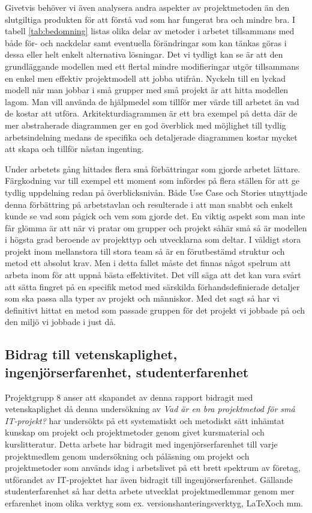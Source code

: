 \documentclass[conference]{IEEEtran}
\begin{document}
Givetvis behöver vi även analysera andra aspekter av projektmetoden än den slutgiltiga produkten för att förstå vad som har fungerat bra och mindre bra. I tabell \ref{tab:bedomning} listas olika delar av metoder i arbetet tillsammans med både för- och nackdelar samt eventuella förändringar som kan tänkas göras i dessa eller helt enkelt alternativa lösningar. Det vi tydligt kan se är att den grundläggande modellen med ett flertal mindre modifieringar utgör tillsammans en enkel men effektiv projektmodell att jobba utifrån. Nyckeln till en lyckad modell när man jobbar i små grupper med små projekt är att hitta modellen lagom. Man vill använda de hjälpmedel som tillför mer värde till arbetet än vad de kostar att utföra. Arkitekturdiagrammen är ett bra exempel på detta där de mer abstraherade diagrammen ger en god överblick med möjlighet till tydlig arbetsindelning medans de specifika och detaljerade diagrammen kostar mycket att skapa och tillför nästan ingenting.

Under arbetets gång hittades flera små förbättringar som gjorde arbetet lättare. Färgkodning var till exempel ett moment som infördes på flera ställen för att ge tydlig uppdelning redan på överblicksnivån. Både Use Case och Stories utnyttjade denna förbättring på arbetstavlan och resulterade i att man snabbt och enkelt kunde se vad som pågick och vem som gjorde det. En viktig aspekt som man inte får glömma är att när vi pratar om grupper och projekt såhär små så är modellen i högsta grad beroende av projekttyp och utvecklarna som deltar. I väldigt stora projekt inom mellanstora till stora team så är en förutbestämd struktur och metod ett absolut krav. Men i detta fallet måste det finnas något spelrum att arbeta inom för att uppnå bästa effektivitet. Det vill säga att det kan vara svårt att sätta fingret på en specifik metod med särskilda förhandsdefinierade detaljer som ska passa alla typer av projekt och människor. Med det sagt så har vi definitivt hittat en metod som passade gruppen för det projekt vi jobbade på och den miljö vi jobbade i just då.

\subsection{Bidrag till vetenskaplighet, ingenjörserfarenhet, studenterfarenhet}
Projektgrupp 8 anser att skapandet av denna rapport bidragit med vetenskaplighet då denna undersökning av \textit{Vad är en bra projektmetod för små IT-projekt?} har undersökts 
på ett systematiskt och metodiskt sätt inhämtat kunskap om projekt och projektmetoder genom givet kursmaterial och kurslitteratur. Detta arbete har bidragit med ingenjörserfarenhet 
till varje projektmedlem genom undersökning och påläsning om projekt och projektmetoder som används idag i arbetslivet på ett brett spektrum av företag, utförandet av IT-projektet 
har även bidragit till ingenjörserfarenhet. Gällande studenterfarenhet så har detta arbete utvecklat projektmedlemmar genom mer erfarenhet inom olika verktyg som ex. 
versionshanteringsverktyg, \LaTeX\:och mm.
\end{document}
